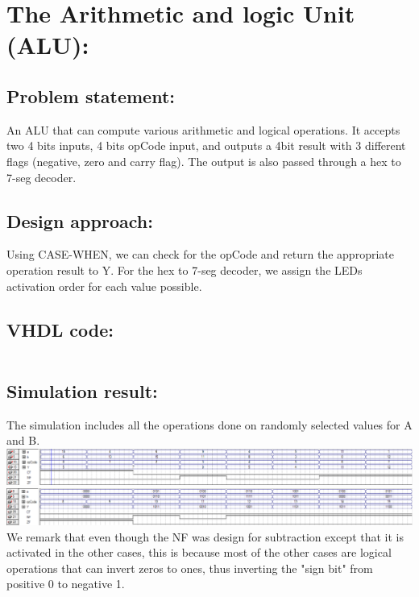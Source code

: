 \documentclass[a4paper, 12pt, english]{article}
\begin{document}
\newpage
\section{The Arithmetic and logic Unit (ALU):}
\subsection{Problem statement:}
An ALU that can compute various arithmetic and logical operations. It accepts two 4 bits inputs, 4 bits opCode input, and outputs a 4bit result with 3 different flags (negative, zero and carry flag). The output is also passed through a hex to 7-seg decoder.\\
\subsection{Design approach:}
Using CASE-WHEN, we can check for the opCode and return the appropriate operation result to Y. For the hex to 7-seg decoder, we assign the LEDs activation order for each value possible.

\subsection{VHDL code:}
\inputminted[linenos,bgcolor=gray!20]{Vhdl}{ex3.vhd}
\subsection{Simulation result:}
The simulation includes all the operations done on randomly selected values for A and B.
\includegraphics[width=\textwidth]{lab 1/ex3.png}
\includegraphics[width=\textwidth]{lab 1/ex3-2.png}
We remark that even though the NF was design for subtraction except that it is activated in the other cases, this is because most of the other cases are logical operations that can invert zeros to ones, thus inverting the "sign bit" from positive 0 to negative 1.
\end{document}
